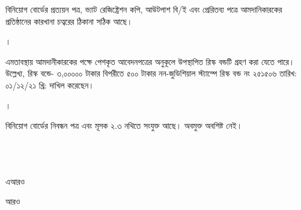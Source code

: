 \documentclass[12pt]{article}
\newcommand{\riskbondt}{৩,০০০০০}
\newcommand{\riskbondg}{৫০০}
\begin{document}
\begin{minipage}[t]{0.96\linewidth}
বিনিয়োগ বোর্ডের প্রত্যয়ন পত্র,
ভ্যাট রেজিষ্ট্রেশন কপি,
আউটপাশ বি/ই এবং প্রেরিতব্য পত্রে
আমদানিকারকের প্রতিষ্ঠানের কারখানা চত্বরের
ঠিকানা সঠিক আছে।
\\
\end{minipage}
\begin{minipage}[t]{0.04\linewidth}
।
\end{minipage}
\begin{minipage}[t]{0.96\linewidth}
এমতাবস্থায় আমদানীকারকের পক্ষে
পেশকৃত আবেদনপত্রের অনুকূলে
উপস্থাপিত রিস্ক বন্ডটি গ্রহণ করা যেতে পারে।
উল্লেখ্য, রিস্ক বন্ডে-
{\riskbondt}
টাকার বিপরীতে
{\riskbondg}
টাকার নন-জুডিশিয়াল
স্ট্যাম্পে রিস্ক বন্ড নং ২৫১৫০৬
তারিখ: ০১/১২/২১ খ্রি: দাখিল করেছেন।
\\
\end{minipage}
\begin{minipage}[t]{0.04\linewidth}
।
\end{minipage}
\begin{minipage}[t]{0.96\linewidth}
বিনিয়োগ বোর্ডের নিবন্ধন পত্র এবং
মূসক ২.৩ নথিতে সংযুক্ত আছে।
অবমুক্ত অবশিষ্ট নেই।
\\
\\
\\
\\
\end{minipage}
\normalsize
\begin{minipage}[t]{0.6\linewidth}
\hspace{1em}
\end{minipage}
\begin{minipage}[t]{0.2\linewidth}
এআরও
\end{minipage}
\begin{minipage}[t]{0.2\linewidth}
আরও
\end{minipage}
\thispagestyle{laststyle}
\end{document}
